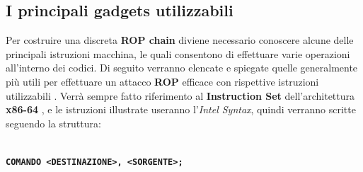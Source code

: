 \subsection*{I principali gadgets utilizzabili}
\label{par:Useful-gadgets}
Per costruire una discreta \textbf{ROP chain} diviene necessario conoscere alcune delle principali istruzioni macchina, le quali consentono di effettuare varie operazioni all'interno dei codici. Di seguito verranno elencate e spiegate quelle generalmente
più utili per effettuare un attacco \textbf{ROP} efficace con rispettive istruzioni utilizzabili \cite*{ROP-Basics}. Verrà sempre fatto riferimento al \textbf{Instruction Set} dell'architettura \textbf{x86-64} \cite*{ISA-x86-64},
e le istruzioni illustrate useranno l'\textit{Intel Syntax}, quindi verranno scritte seguendo la struttura:\\\\
\centerline{\texttt{\large{\textbf{\textcolor{Bittersweet}{COMANDO}  \space  <DESTINAZIONE>, <SORGENTE>;}}}}\\

